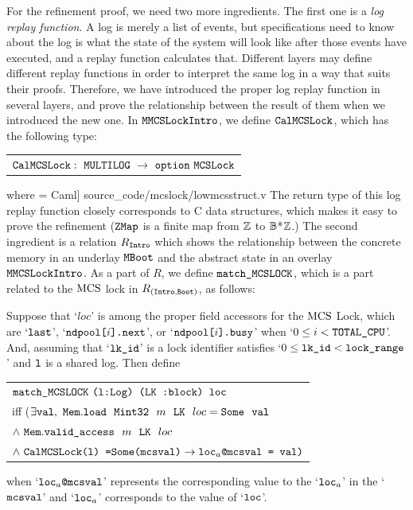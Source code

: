 For the refinement proof, we need two more ingredients.
The first one is a \emph{log replay function}.
A log is merely a list of events, but specifications need to know about the log is what the state of the system will look like after those events have executed,
and a replay function calculates that. 
Different layers may define different replay functions in order to interpret the same log in a way that suits their proofs.
Therefore, we have introduced the proper log replay function in several layers, and prove the relationship between the result of them when we introduced the new one.
In ${\mathrm{\texttt{MMCSLockIntro}}}$, we define ${\mathrm{\texttt{CalMCSLock}}}$, which has the following type:\newline
\begin{tabular}{P{0.95\textwidth}}
$ \calmcslock :\ \lockmultilog\ \rightarrow\ \optiondef\ \lockabsloc$
\end{tabular}\newline
where
 = Caml] {source_code/mcslock/lowmcsstruct.v}
The return type of this log replay function closely corresponds to C data structures, which makes it easy to prove the refinement (${\mathrm{\texttt{ZMap}}}$ is a finite map from ${\mathbb{Z}}$ to ${\mathbb{B}}$*${\mathbb{Z}}$.)
The second ingredient is a relation $R_{{\mathrm{\texttt{Intro}}}}$ which shows the relationship between the concrete memory in an underlay ${\mathrm{\texttt{MBoot}}}$ and the abstract state in an overlay ${\mathrm{\texttt{MMCSLockIntro}}}$.
As a part of $R$, we define $\matchmcslock$, which is a part related to 
the $\mathrm{MCS}$ lock in $R_{({\mathrm{\texttt{Intro}}}, {\mathrm{\texttt{Boot}}})}$,  as follows:

\begin{definition}[$\matchmcslock$]
Suppose that `$loc$' is among the proper field accessors for the $\mathrm{MCS}$ Lock, which are `${\mathrm{\texttt{last}}}$', `${\mathrm{\texttt{ndpool[}}}i{\mathrm{\texttt{].next}}}$', or  `${\mathrm{\texttt{ndpool[}}}i{\mathrm{\texttt{].busy}}}$' when `$0 \leq i < {\mathrm{\texttt{TOTAL\_CPU}}}$'.
 And, assuming that `${\mathrm{\texttt{lk\_id}}}$' is a lock identifier satisfies `$0 \leq {\mathrm{\texttt{lk\_id}}} < {\mathrm{\texttt{lock\_range}}}$' and ${\mathrm{\texttt{l}}}$ is a shared log. Then define \newline
  \begin{tabular}{P{0.90\textwidth}}
    $\matchmcslock\ \codeinmath{(l:Log) (}\lockmemloc\codeinmath{ :block) loc}$\\
      iff ($\exists \codeinmath{val},\ \memloadsome{\memintregulartype}{m}{\lockmemloc}{loc}{\codeinmath{val}}$\\
        $\wedge\  {\mathrm{\texttt{Mem}}} . {\mathrm{\texttt{valid\_access}}} ~~{m} ~~ {{\mathrm{\texttt{LK}}}} ~~ {loc}$\\
      $\wedge\ \calmcslock \codeinmath{(l) =}\Some\codeinmath{(mcsval)}\rightarrow\codeinmath{loc}_{a}\codeinmath{@mcsval = val)}$\\
\end{tabular}\newline
    when `${\mathrm{\texttt{loc}}}_{a}{\mathrm{\texttt{@mcsval}}}$' represents the corresponding 
    value to the `${\mathrm{\texttt{loc}}}_{a}$' in the `${\mathrm{\texttt{mcsval}}}$' 
    and `${\mathrm{\texttt{loc}}}_{a}$' corresponds to the value of `${\mathrm{\texttt{loc}}}$'.
\end{definition}

